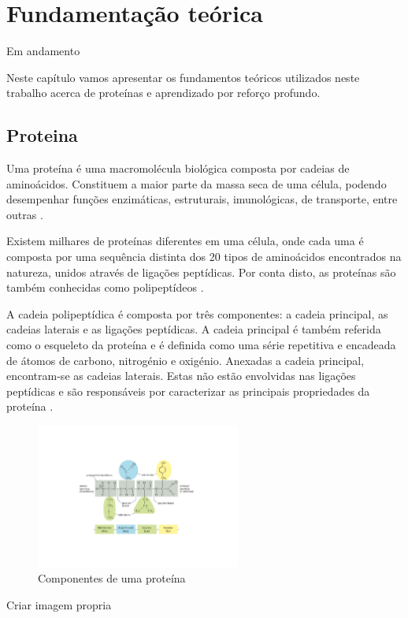 

\chapter{Fundamentação teórica}
{\color{red} Em andamento}

Neste capítulo vamos apresentar os fundamentos teóricos utilizados neste trabalho acerca de proteínas e aprendizado por reforço profundo. 


\section{Proteina}
Uma proteína é uma macromolécula biológica composta por cadeias de aminoácidos. 
Constituem a maior parte da massa seca de uma célula, podendo desempenhar funções enzimáticas, estruturais,
imunológicas, de transporte, entre outras \cite{Bio}. 

Existem milhares de proteínas diferentes em uma célula, onde cada uma é composta por uma sequência distinta dos 20 tipos de aminoácidos encontrados na natureza, unidos através de ligações peptídicas. Por conta disto, as proteínas são também conhecidas como polipeptídeos \cite{Bio}. 

A cadeia polipeptídica é composta por três componentes: a cadeia principal, as cadeias laterais e as ligações peptídicas. A cadeia principal é também referida como o esqueleto da proteína e é definida como uma série repetitiva e encadeada de átomos de carbono, nitrogénio e oxigénio. Anexadas a cadeia principal, encontram-se as cadeias laterais. Estas não estão envolvidas nas ligações peptídicas e são responsáveis por caracterizar as principais propriedades da proteína \cite{Bio}. 


\begin{figure}[H]
     \centering
     \includegraphics[width=0.6\textwidth]{figuras/ProteinBackbone.pdf}
     \caption{Componentes de uma proteína \cite{Bio}}
\end{figure}
{\color{red} Criar imagem propria}

